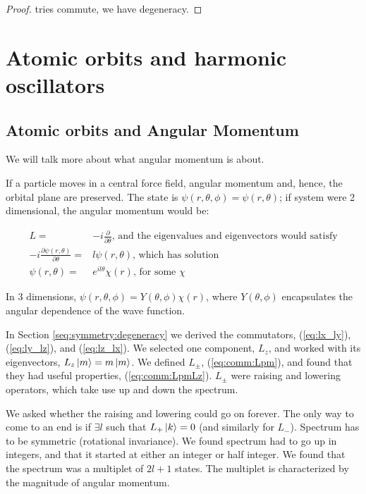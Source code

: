 \documentclass[]{article}
\begin{document}
\begin{proof}
tries commute, we have degeneracy.
\end{proof}



\section{Atomic orbits and harmonic oscillators}

\subsection{Atomic orbits and Angular Momentum}

We will talk more about what angular momentum is about.

If a particle moves in a central force field, angular momentum and, hence, the orbital plane are preserved. The state is $\psi(r,\theta,\phi)= \psi(r,\theta)$; if system were 2 dimensional, the angular momentum would be:

\begin{align*}
L =& -i \frac{\partial}{\partial \theta} \text{, and the eigenvalues and eigenvectors would satisfy}\\
-i \frac{\partial \psi(r,\theta)}{\partial \theta} =& l \psi(r,\theta) \text{, which has solution}\\
\psi(r,\theta) =& e^{i l \theta} \chi(r) \text{, for some $\chi$}
\end{align*}

In 3 dimensions, $\psi(r,\theta,\phi)= Y(\theta,\phi) \chi(r)$, where $Y(\theta,\phi)$ encapsulates the angular dependence of the wave function.

In Section \ref{seq:symmetry:degeneracy} we derived the commutators, (\ref{eq:lx_ly}), (\ref{eq:ly_lz}), and (\ref{eq:lz_lx}). We selected one component, $L_z$, and worked with its eigenvectors, $L_z \ket{m} = m \ket{m}$. We defined $L_\pm$, (\ref{eq:comm:Lpm}), and found that they had useful properties, (\ref{eq:comm:LpmLz}). $L_\pm$ were raising and lowering operators, which take use up and down the spectrum.

We asked whether the raising and lowering could go on forever. The only way to come to an end is if $\exists l$ such that $L_+\ket{k}=0$ (and similarly for $L_-$). Spectrum has to be symmetric (rotational invariance). We found spectrum had to go up in integers, and that it started at either an integer or half integer. We found that the spectrum was a multiplet of $2l+1$ states. The multiplet is characterized by the magnitude of angular momentum.
\end{document}
